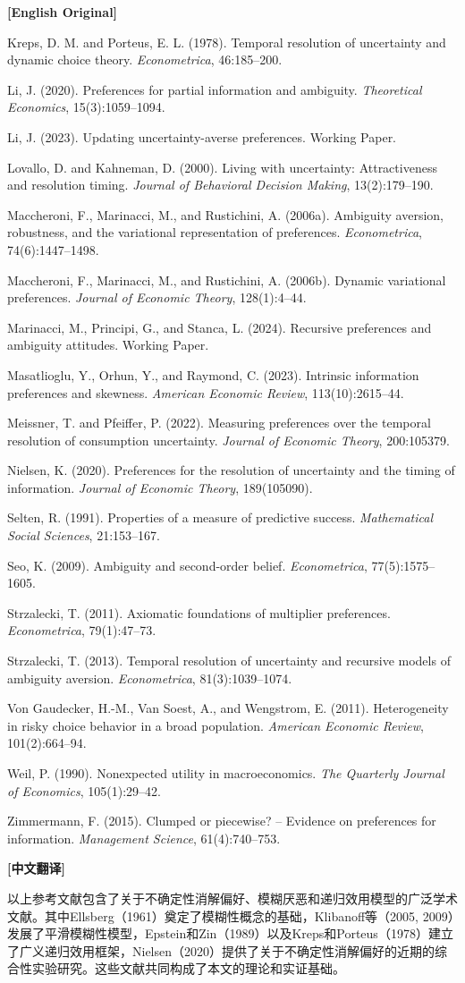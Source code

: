 \documentclass[12pt,a4paper]{ctexart}
\newenvironment{original}{%
  \par\medskip\noindent\textbf{[English Original]}\par\smallskip
  \color{black}\small
}{%
  \par\medskip
}
\newenvironment{translation}{%
  \par\noindent\textbf{[中文翻译]}\par\smallskip
  \color{blue}\small
}{%
  \par\bigskip
}
\theoremstyle{definition}
\theoremstyle{remark}
\begin{document}
\begin{original}
Kreps, D. M. and Porteus, E. L. (1978). Temporal resolution of uncertainty and dynamic choice theory. \textit{Econometrica}, 46:185--200.

Li, J. (2020). Preferences for partial information and ambiguity. \textit{Theoretical Economics}, 15(3):1059--1094.

Li, J. (2023). Updating uncertainty-averse preferences. Working Paper.

Lovallo, D. and Kahneman, D. (2000). Living with uncertainty: Attractiveness and resolution timing. \textit{Journal of Behavioral Decision Making}, 13(2):179--190.

Maccheroni, F., Marinacci, M., and Rustichini, A. (2006a). Ambiguity aversion, robustness, and the variational representation of preferences. \textit{Econometrica}, 74(6):1447--1498.

Maccheroni, F., Marinacci, M., and Rustichini, A. (2006b). Dynamic variational preferences. \textit{Journal of Economic Theory}, 128(1):4--44.

Marinacci, M., Principi, G., and Stanca, L. (2024). Recursive preferences and ambiguity attitudes. Working Paper.

Masatlioglu, Y., Orhun, Y., and Raymond, C. (2023). Intrinsic information preferences and skewness. \textit{American Economic Review}, 113(10):2615--44.

Meissner, T. and Pfeiffer, P. (2022). Measuring preferences over the temporal resolution of consumption uncertainty. \textit{Journal of Economic Theory}, 200:105379.

Nielsen, K. (2020). Preferences for the resolution of uncertainty and the timing of information. \textit{Journal of Economic Theory}, 189(105090).

Selten, R. (1991). Properties of a measure of predictive success. \textit{Mathematical Social Sciences}, 21:153--167.

Seo, K. (2009). Ambiguity and second-order belief. \textit{Econometrica}, 77(5):1575--1605.

Strzalecki, T. (2011). Axiomatic foundations of multiplier preferences. \textit{Econometrica}, 79(1):47--73.

Strzalecki, T. (2013). Temporal resolution of uncertainty and recursive models of ambiguity aversion. \textit{Econometrica}, 81(3):1039--1074.

Von Gaudecker, H.-M., Van Soest, A., and Wengstrom, E. (2011). Heterogeneity in risky choice behavior in a broad population. \textit{American Economic Review}, 101(2):664--94.

Weil, P. (1990). Nonexpected utility in macroeconomics. \textit{The Quarterly Journal of Economics}, 105(1):29--42.

Zimmermann, F. (2015). Clumped or piecewise? -- Evidence on preferences for information. \textit{Management Science}, 61(4):740--753.
\end{original}
\begin{translation}
{\small\color{blue}
以上参考文献包含了关于不确定性消解偏好、模糊厌恶和递归效用模型的广泛学术文献。其中Ellsberg（1961）奠定了模糊性概念的基础，Klibanoff等（2005, 2009）发展了平滑模糊性模型，Epstein和Zin（1989）以及Kreps和Porteus（1978）建立了广义递归效用框架，Nielsen（2020）提供了关于不确定性消解偏好的近期的综合性实验研究。这些文献共同构成了本文的理论和实证基础。}
\end{translation}
\end{document}
